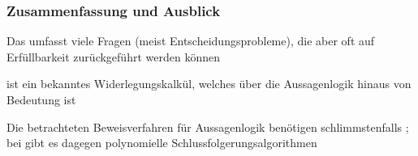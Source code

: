 \documentclass[onlymath]{beamer}
\begin{document}
\begin{frame}\frametitle{Zusammenfassung und Ausblick}

Das  umfasst viele Fragen (meist Entscheidungsprobleme), die aber oft
auf Erfüllbarkeit zurückgeführt werden können
\bigskip

 ist ein bekanntes Widerlegungskalkül, welches über die Aussagenlogik hinaus von Bedeutung ist
\bigskip

Die betrachteten Beweisverfahren für Aussagenlogik benötigen schlimmstenfalls ; bei
 gibt es dagegen polynomielle Schlussfolgerungsalgorithmen\bigskip


\end{frame}
\end{document}
